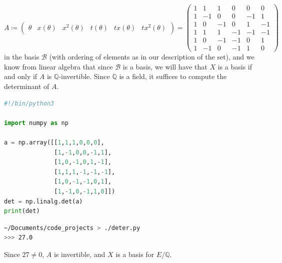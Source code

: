\documentclass[11pt, letterpaper]{article}
\begin{document}
\[
	A\coloneqq \begin{pmatrix}
	\theta  & x(\theta ) & x^2(\theta ) & t(\theta ) & tx(\theta ) & tx^2(\theta )
	\end{pmatrix}=\begin{pmatrix}
	1 & 1 & 1 & 0 & 0 & 0 \\
	1 & -1 & 0 & 0 & -1 & 1 \\
	1 & 0 & -1 & 0 & 1 & -1 \\
	1 & 1 & 1 & -1 & -1 & -1 \\
	1 & 0 & -1 & -1 & 0 & 1 \\
	1 & -1 & 0 & -1 & 1 & 0
	\end{pmatrix}
\]
in the basis $\mathcal{B} $ (with ordering of elements as in our description of the set), and we know from linear algebra that since $\mathcal{B} $ is a basis, we will have that $X$ is a basis if and only if $A$ is $\mathbb{Q} $-invertible. Since $\mathbb{Q} $ is a field, it suffices to compute the determinant of $A$.
\begin{lstlisting}[language=Python]
#!/bin/python3

import numpy as np

a = np.array([[1,1,1,0,0,0],
              [1,-1,0,0,-1,1],
              [1,0,-1,0,1,-1],
              [1,1,1,-1,-1,-1],
              [1,0,-1,-1,0,1],
              [1,-1,0,-1,1,0]])
det = np.linalg.det(a)
print(det)
\end{lstlisting}
\begin{lstlisting}[language=Bash]
~/Documents/code_projects > ./deter.py 
>>> 27.0
\end{lstlisting}
Since $27\neq 0$, $A$ is invertible, and $X$ is a basis for $E/\mathbb{Q} $.
\end{document}
